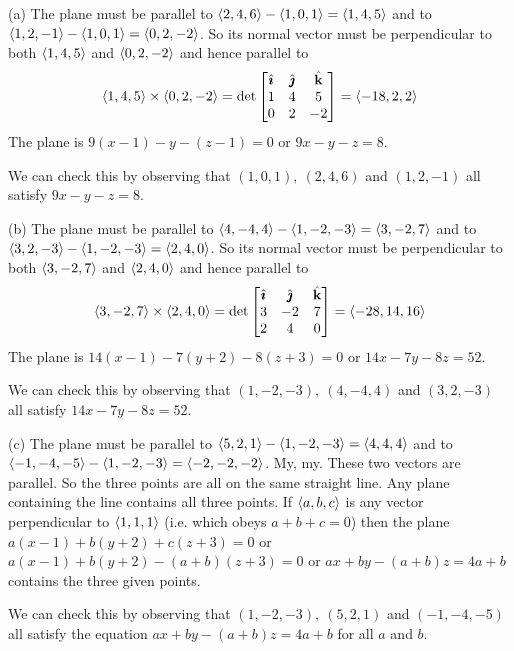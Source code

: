 \begin{solution}
(a) The plane must be parallel to 
   $\left< 2,4,6\right> -\left< 1,0,1\right> =\left< 1,4,5\right> $
 and to $\left< 1,2,-1\right> -\left< 1,0,1\right> =\left< 0,2,-2\right> $. 
So its normal vector must be perpendicular to both $\left< 1,4,5\right> $ 
and $\left< 0,2,-2\right> $ and hence parallel to
\begin{equation*}
\left< 1,4,5\right> \times\left< 0,2,-2\right> 
=\det\left[\begin{matrix}
           \hat{\pmb{\imath}} & \hat{\pmb{\jmath}} & \hat{\mathbf{k}} \\
           1  &  4  &  5 \\
           0  &  2  &  -2
  \end{matrix}\right]
=\left< -18,2,2\right>
\end{equation*} 
The plane is $9(x-1)-y-(z-1)=0$ or $9x-y-z=8$. 

We can check this by observing that 
$(1,0,1),\ (2,4,6)$ and $(1,2,-1)$ all satisfy $9x-y-z=8$.

(b) The plane must be parallel to 
$\left< 4,-4,4\right> -\left< 1,-2,-3\right> =\left< 3,-2,7\right> $
and to $\left< 3,2,-3\right> -\left< 1,-2,-3\right> =\left< 2,4,0\right> $. So its normal 
vector must be perpendicular to both $\left< 3,-2,7\right> $ and $\left< 2,4,0\right>$ 
and hence parallel to
\begin{equation*}
\left< 3,-2,7\right> \times\left< 2,4,0\right> 
=\det\left[\begin{matrix}
           \hat{\pmb{\imath}} & \hat{\pmb{\jmath}} & \hat{\mathbf{k}} \\
           3  &  -2  &  7 \\
           2  &  4  &  0
  \end{matrix}\right]
=\left< -28,14,16\right>
\end{equation*} 
The plane is $14(x-1)-7(y+2)-8(z+3)=0$ or $14x-7y-8z=52$. 

We can check this by observing that 
$(1,-2,-3),\ (4,-4,4)$ and $(3,2,-3)$ all satisfy $14x-7y-8z=52$.

(c) The plane must be parallel to 
     $\left< 5,2,1\right> -\left< 1,-2,-3\right> =\left< 4,4,4\right> $
 and to $\left< -1,-4,-5\right> -\left< 1,-2,-3\right> =\left< -2,-2,-2\right> $. 
My, my. These two vectors are parallel. So the three points are all on the 
same straight line. Any plane containing the line contains all three points. 
If $\left< a,b,c\right>$ is any vector perpendicular to $\left< 1,1,1\right>$ 
(i.e. which obeys $a+b+c=0$) then the plane  
$a(x-1)+b(y+2)+c(z+3)=0$ or $a(x-1)+b(y+2)-(a+b)(z+3)=0$ 
or $ax+by-(a+b)z=4a+b$ contains the three given points. 

We can check this by observing that 
$(1,-2,-3),\ (5,2,1)$ and $(-1,-4,-5)$ all
satisfy the equation $ax+by-(a+b)z=4a+b$ for all $a$ and $b$.
\end{solution}

